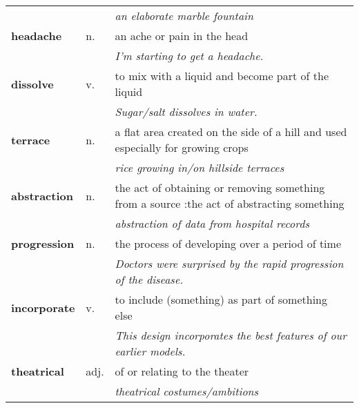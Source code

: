 \documentclass[a4paper]{article}
\begin{document}
\begin{longtable}{llp{12cm}}
 & & \textit{an elaborate marble fountain}\\[0.08cm]
\textbf{headache} & n. &  an ache or pain in the head \\
 & & \textit{I'm starting to get a headache.}\\[0.08cm]
\textbf{dissolve} & v. &  to mix with a liquid and become part of the liquid \\
 & & \textit{Sugar/salt dissolves in water.}\\[0.08cm]
\textbf{terrace} & n. &  a flat area created on the side of a hill and used especially for growing crops \\
 & & \textit{rice growing in/on hillside terraces}\\[0.08cm]
\textbf{abstraction} & n. &  the act of obtaining or removing something from a source :the act of abstracting something \\
 & & \textit{abstraction of data from hospital records}\\[0.08cm]
\textbf{progression} & n. &  the process of developing over a period of time \\
 & & \textit{Doctors were surprised by the rapid progression of the disease.}\\[0.08cm]
\textbf{incorporate} & v. &  to include (something) as part of something else \\
 & & \textit{This design incorporates the best features of our earlier models.}\\[0.08cm]
\textbf{theatrical} & adj. &  of or relating to the theater \\
 & & \textit{theatrical costumes/ambitions}\\[0.08cm]
\end{longtable}
\end{document}
